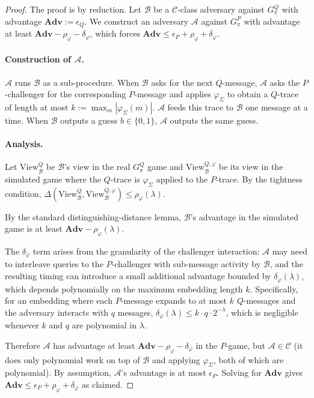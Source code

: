 \documentclass[11pt]{article}
\theoremstyle{definition}
\theoremstyle{remark}
\newcommand{\Adv}{\mathbf{Adv}}
\begin{document}
\begin{proof}
The proof is by reduction. Let $\mathcal{B}$ be a $\mathcal{C}$-class
adversary against $G_\pi^Q$ with advantage $\Adv := \epsilon_Q$. We
construct an adversary $\mathcal{A}$ against $G_\pi^P$ with
advantage at least $\Adv - \rho_\varphi - \delta_\varphi$, which
forces $\Adv \le \epsilon_P + \rho_\varphi + \delta_\varphi$.

\paragraph{Construction of $\mathcal{A}$.}
$\mathcal{A}$ runs $\mathcal{B}$ as a sub-procedure. When
$\mathcal{B}$ asks for the next $Q$-message, $\mathcal{A}$ asks the
$P$-challenger for the corresponding $P$-message and applies
$\varphi_\Sigma$ to obtain a $Q$-trace of length at most $k :=
\max_m |\varphi_\Sigma(m)|$. $\mathcal{A}$ feeds this trace to
$\mathcal{B}$ one message at a time. When $\mathcal{B}$ outputs a
guess $b \in \{0, 1\}$, $\mathcal{A}$ outputs the same guess.

\paragraph{Analysis.}
Let $\mathrm{View}_\mathcal{B}^Q$ be $\mathcal{B}$'s view in the
real $G_\pi^Q$ game and $\mathrm{View}_\mathcal{B}^{Q,\varphi}$ be
its view in the simulated game where the $Q$-trace is
$\varphi_\Sigma$ applied to the $P$-trace. By the tightness
condition, $\Delta(\mathrm{View}_\mathcal{B}^Q,
\mathrm{View}_\mathcal{B}^{Q,\varphi}) \le \rho_\varphi(\lambda)$.

By the standard distinguishing-distance lemma, $\mathcal{B}$'s
advantage in the simulated game is at least $\Adv -
\rho_\varphi(\lambda)$.

The $\delta_\varphi$ term arises from the granularity of the
challenger interaction: $\mathcal{A}$ may need to interleave queries
to the $P$-challenger with sub-message activity by $\mathcal{B}$, and
the resulting timing can introduce a small additional advantage
bounded by $\delta_\varphi(\lambda)$, which depends polynomially on
the maximum embedding length $k$. Specifically, for an embedding
where each $P$-message expands to at most $k$ $Q$-messages and the
adversary interacts with $q$ messages, $\delta_\varphi(\lambda) \le
k \cdot q \cdot 2^{-\lambda}$, which is negligible whenever $k$ and
$q$ are polynomial in $\lambda$.

Therefore $\mathcal{A}$ has advantage at least $\Adv - \rho_\varphi
- \delta_\varphi$ in the $P$-game, but $\mathcal{A} \in \mathcal{C}$
(it does only polynomial work on top of $\mathcal{B}$ and applying
$\varphi_\Sigma$, both of which are polynomial). By assumption,
$\mathcal{A}$'s advantage is at most $\epsilon_P$. Solving for
$\Adv$ gives $\Adv \le \epsilon_P + \rho_\varphi + \delta_\varphi$
as claimed.
\end{proof}
\end{document}
